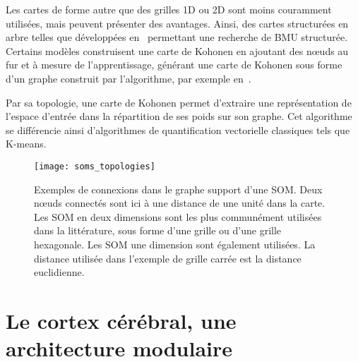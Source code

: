 \documentclass[../main]{subfiles}
\begin{document}
Les cartes de forme autre que des grilles 1D ou 2D sont moins couramment utilisées, mais peuvent présenter des avantages. Ainsi, des cartes structurées en arbre telles que développées en~\cite{koikkalainen_self-organizing_1990} permettant une recherche de BMU structurée. Certains modèles construisent une carte de Kohonen en ajoutant des n\oe{}uds au fur et à mesure de l'apprentissage, générant une carte de Kohonen sous forme d'un graphe construit par l'algorithme, par exemple en~\cite{alahakoon_dynamic_2000, yamaguchi_adaptive_2010}.

Par sa topologie, une carte de Kohonen permet d'extraire une représentation de l'espace d'entrée dans la répartition de ses poids sur son graphe. Cet algorithme se différencie ainsi d'algorithmes de quantification vectorielle classiques tels que K-means.

\begin{figure}
\centering
\texttt{[image: soms\_topologies]}
\caption{Exemples de connexions dans le graphe support d'une SOM. Deux n\oe{}uds connectés sont ici à une distance de une unité dans la carte.
Les SOM en deux dimensions sont les plus communément utilisées dans la littérature, sous forme d'une grille ou d'une grille hexagonale. Les SOM une dimension sont également utilisées. La distance utilisée dans l'exemple de grille carrée est la distance euclidienne.
\label{fig:topo}}
\end{figure}




\section{Le cortex cérébral, une architecture modulaire}
\end{document}
